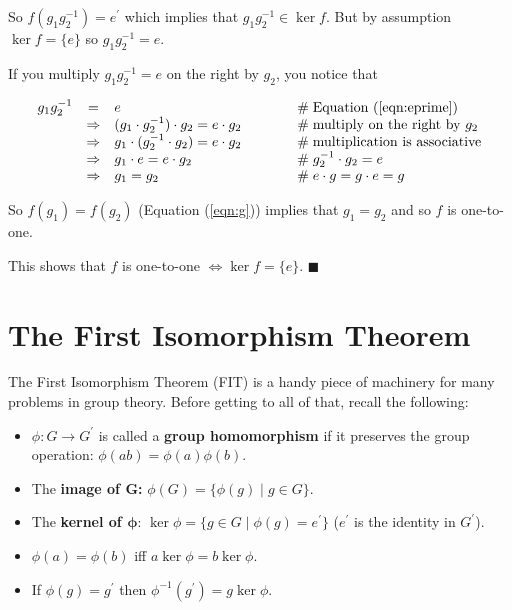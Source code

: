\documentclass{article}
\theoremstyle{definition}
\begin{document}
\begin{itemize}
So $f(g_1g_2^{-1}) = e^\prime$ which implies that $g_1g_2^{-1}
\in \ker f$. But by assumption $\ker f = \{e\}$ so $g_1g_2^{-1} =
e$.

If you multiply $g_1g_2^{-1}  = e$  on the right by $g_2$, you
notice that  

\begin{equation*}
\begin{array}{rcll}
g_1g_2^{-1}
&=& e                                                           &\hspace{3em} \mathrel{\#} \text{Equation (\ref{eqn:eprime})} \\
&\Rightarrow&  (g_1 \cdot g_2^{-1}) \cdot g_2 = e \cdot g_2     &\hspace{3em} \mathrel{\#} \text{multiply on the right by $g_2$} \\
&\Rightarrow&  g_1 \cdot  (g_2^{-1} \cdot g_2) = e \cdot g_2    &\hspace{3em} \mathrel{\#} \text{multiplication is associative} \\
&\Rightarrow&  g_1 \cdot e = e \cdot g_2                        &\hspace{3em} \mathrel{\#} g_2^{-1} \cdot g_2 = e \\
&\Rightarrow&  g_1 =  g_2                                       &\hspace{3em} \mathrel{\#} e \cdot g = g \cdot e = g
\end{array}
\end{equation*}


So $f(g_1) = f(g_2)$ (Equation (\ref{eqn:g})) implies that 
$g_1 = g_2$ and so $f$ is one-to-one.
\end{itemize}

\noindent
This shows that $f$ is one-to-one  $\iff \ker f =\{e\}$. 
$\blacksquare$

\section{The First Isomorphism Theorem}
The First Isomorphism Theorem (FIT) is a handy piece of machinery
for many problems in group theory. Before getting to all of that,
recall the following:

\smallskip
\begin{itemize}
\item $\phi: G \rightarrow G^\prime$ is called a
      \textbf{group homomorphism} if it preserves the group 
      operation: $\phi(ab) = \phi(a)\phi(b)$.
\item The \textbf{image of $\mathbf{G}$:}  $\phi(G) = \{\phi(g) \mid g \in G\}$.
\item The \textbf{kernel of $\boldsymbol{\phi}$}: $\ker \phi =
      \{g \in G \mid \phi(g) = e^\prime\}$  ($e^\prime$ is the identity
      in $G^\prime$). 
\item $\phi(a) = \phi(b)$ iff $a \ker \phi = b \ker \phi$.
\item If $\phi(g) = g^\prime$ then $\phi^{-1}(g^{\prime}) = g
      \ker \phi$. 
\end{itemize}
\end{document}
